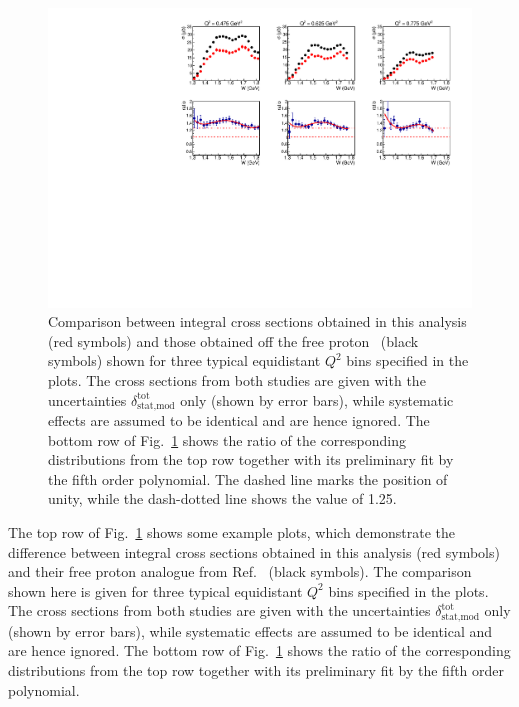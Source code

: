 \begin{figure}[htp]
\begin{center}
\includegraphics[width=\textwidth]{pictures/conclusion/with_fed_comp.pdf}
\caption{\small Comparison between integral cross sections obtained in this analysis (red symbols) and those obtained off the free proton~\cite{Fed_an_note:2017,Fed_paper_2018} (black symbols) shown for three typical equidistant $Q^{2}$ bins specified in the plots. The cross sections from both studies are given with the uncertainties $\delta_{\text{stat,mod}}^{\text{tot}}$ only (shown by error bars), while systematic effects are assumed to be identical and are hence ignored. The bottom row of Fig.~\ref{fig:int_q2_dep} shows the ratio of the corresponding distributions from the top row together with its preliminary fit by the fifth order polynomial. The dashed line marks the position of unity, while the dash-dotted line shows the value of 1.25. } \label{fig:int_q2_dep}
\end{center}
\end{figure}

The top row of Fig.~\ref{fig:int_q2_dep} shows some example plots, which demonstrate the difference between integral cross sections obtained in this analysis (red symbols) and their free proton analogue from Ref.~\cite{Fed_an_note:2017,Fed_paper_2018} (black symbols). The comparison shown here is given for three typical equidistant $Q^{2}$ bins specified in the plots. The cross sections from both studies are given with the uncertainties $\delta_{\text{stat,mod}}^{\text{tot}}$ only (shown by error bars), while systematic effects are assumed to be identical and are hence ignored. The bottom row of Fig.~\ref{fig:int_q2_dep} shows the ratio of the corresponding distributions from the top row together with its preliminary fit by the fifth order polynomial.


